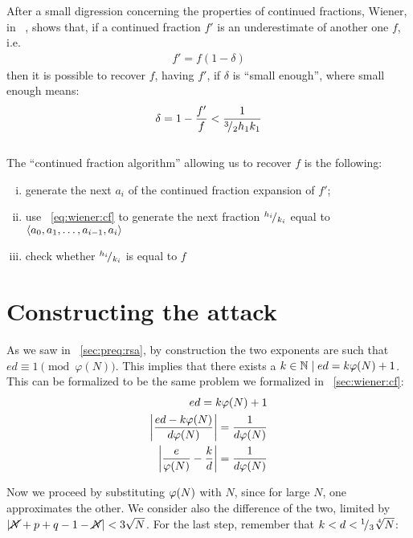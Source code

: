 After a small digression concerning the properties of continued fractions, Wiener, in
~\cite{wiener}, shows that, if a continued fraction $f'$ is an underestimate of
another one $f$, i.e.
\begin{align}
  f' = f(1-\delta)
\end{align}
then it is possible to recover $f$, having $f'$, if $\delta$ is ``small
enough'', where small enough means:
\begin{align}
  \label{eq:wiener:cf_approx}
  \delta = 1 - \frac{f'}{f} < \frac{1}{{}^{3}\!/_{2}{h_1}{k_1}}
\end{align}
\\
The ``continued fraction algorithm'' allowing us to recover $f$ is the
following:
\begin{enumerate}[(i)]
  \setlength{\itemsep}{1pt}
  \setlength{\parskip}{0pt}
  \setlength{\parsep}{0pt}
  \item generate the next $a_i$ of the continued fraction expansion of $f'$;
  \item use ~\ref{eq:wiener:cf} to generate the next fraction ${}^{h_i}\!/_{k_i}$
    equal to $\langle a_0, a_1, \ldots, a_{i-1}, a_i\rangle$ %
  \item check whether ${}^{h_i}\!/_{k_i}$ is equal to $f$
\end{enumerate}

\section{Constructing the attack}

As we saw in ~\ref{sec:preq:rsa}, by construction the two exponents are such that
$ed \equiv 1 \pmod{\varphi(N)}$. This implies that there exists a
$k \in \mathbb{N} \mid ed = k\varphi(N) + 1$. This can be formalized to be
the same problem we formalized in ~\ref{sec:wiener:cf}:
\begin{align*}
  ed = k\varphi(N) + 1 \\
  \left|\frac{ed - k\varphi(N)}{d\varphi(N)}\right| = \frac{1}{d\varphi(N)} \\
  \left|\frac{e}{\varphi(N)} - \frac{k}{d}\right| = \frac{1}{d\varphi(N)} \\
\end{align*}

Now we proceed by substituting $\varphi(N)$ with $N$, since for large $N$, one
approximates the other. We consider also the difference of the two, limited by
$\left|\cancel{N} + p + q - 1 - \cancel{N}\right| < 3\sqrt{N}$.
For the last step, remember that $k < d < {}^{1}\!/_{3}\sqrt[4]{N}$:

